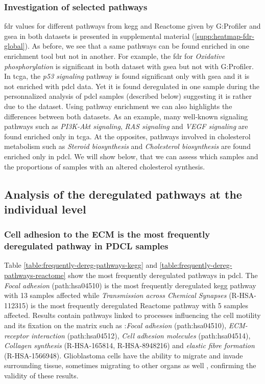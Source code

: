 \subsubsection{Investigation of selected pathways}

\acrshort{fdr} values for different pathways from \acrshort{kegg} and Reactome given by G:Profiler and \acrshort{gsea} in both datasets is presented in supplemental material (\ref*{supp:heatmap-fdr-global}).
As before, we see that a same pathways can be found enriched in one enrichment tool but not in another.
For example, the \acrshort{fdr} for \textit{Oxidative phosphorylation} is significant in both dataset with \acrshort{gsea} but not with G:Profiler.
In \acrshort{tcga}, the \textit{p53 signaling} pathway is found significant only with \acrshort{gsea} and it is not enriched with \acrshort{pdcl} data.
Yet it is found deregulated in one sample during the personnalized analysis of \acrshort{pdcl} samples (described below) suggesting it is rather due to the dataset.
Using pathway enrichment we can also highlights the differences between both datasets.
As an example, many well-known signaling pathways such as \textit{PI3K-Akt signaling}, \textit{RAS signaling} and \textit{VEGF signaling} are found enriched only in \acrshort{tcga}.
At the opposites, pathways involved in cholesterol metabolism such as \textit{Steroid biosynthesis} and \textit{Cholesterol biosynthesis} are found enriched only in \acrshort{pdcl}.
We will show below, that we can assess which samples and the proportions of samples with an altered cholesterol synthesis.

\subsection{Analysis of the deregulated pathways at the individual level}

\subsubsection{Cell adhesion to the ECM is the most frequently deregulated pathway in PDCL samples}

Table \ref*{table:frequently-dereg-pathways-kegg} and \ref*{table:frequently-dereg-pathways-reactome} show the most frequently deregulated pathways in \acrshort{pdcl}.
The \textit{Focal adhesion} (path:hsa04510) is the most frequently deregulated \acrshort{kegg} pathway with 13 samples affected while \textit{Transmission across Chemical Synapses} (R-HSA-112315) is the most frequently deregulated Reactome pathway with 5 samples affected.
Results contain pathways linked to processes influencing the cell motility and its fixation on the matrix such as :\textit{Focal adhesion} (path:hsa04510), \textit{ECM-receptor interaction} (path:hsa04512), \textit{Cell adhesion molecules} (path:hsa04514), \textit{Collagen synthesis} (R-HSA-165814, R-HSA-8948216) and \textit{elastic fibre formation} (R-HSA-1566948).
Glioblastoma cells have the ability to migrate and invade surrounding tissue, sometimes migrating to other organs as well \cite*{Lah2020}, confirming the validity of these results.

